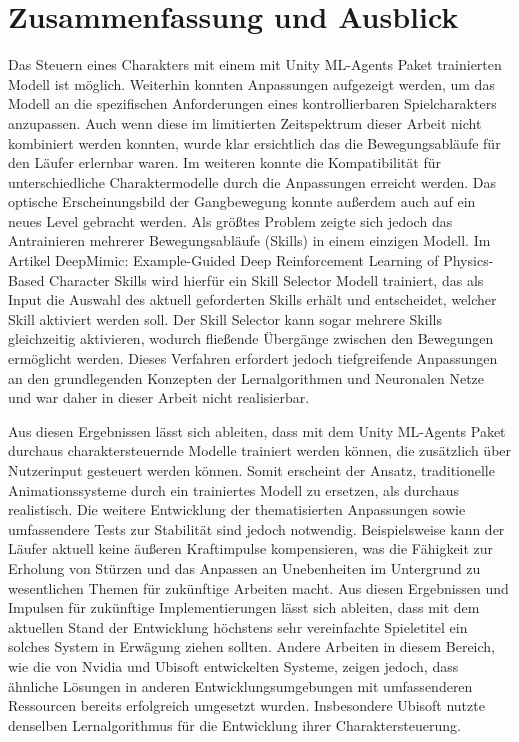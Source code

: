 {\chapter{Zusammenfassung und Ausblick}}
\label{sec:zusammenfassung_ausblick}
Das Steuern eines Charakters mit einem mit Unity ML-Agents Paket trainierten Modell ist möglich. Weiterhin konnten Anpassungen aufgezeigt werden, um das Modell an die spezifischen Anforderungen eines kontrollierbaren Spielcharakters anzupassen. Auch wenn diese im limitierten Zeitspektrum dieser Arbeit nicht kombiniert werden konnten, wurde klar ersichtlich das die Bewegungsabläufe für den Läufer erlernbar waren. Im weiteren konnte die Kompatibilität für unterschiedliche Charaktermodelle durch die Anpassungen erreicht werden. Das optische Erscheinungsbild der Gangbewegung konnte außerdem auch auf ein neues Level gebracht werden. Als größtes Problem zeigte sich jedoch das Antrainieren mehrerer Bewegungsabläufe (Skills) in einem einzigen Modell. Im Artikel \grqq{}DeepMimic: Example-Guided Deep Reinforcement Learning of Physics-Based Character Skills\grqq{} wird hierfür ein Skill Selector Modell trainiert, das als Input die Auswahl des aktuell geforderten Skills erhält und entscheidet, welcher Skill aktiviert werden soll. Der Skill Selector kann sogar mehrere Skills gleichzeitig aktivieren, wodurch fließende Übergänge zwischen den Bewegungen ermöglicht werden.\cite{peng2018deepmimic} Dieses Verfahren erfordert jedoch tiefgreifende Anpassungen an den grundlegenden Konzepten der Lernalgorithmen und Neuronalen Netze und war daher in dieser Arbeit nicht realisierbar.

Aus diesen Ergebnissen lässt sich ableiten, dass mit dem Unity ML-Agents Paket durchaus charaktersteuernde Modelle trainiert werden können, die zusätzlich über Nutzerinput gesteuert werden können. Somit erscheint der Ansatz, traditionelle Animationssysteme durch ein trainiertes Modell zu ersetzen, als durchaus realistisch. Die weitere Entwicklung der thematisierten Anpassungen sowie umfassendere Tests zur Stabilität sind jedoch notwendig. Beispielsweise kann der Läufer aktuell keine äußeren Kraftimpulse kompensieren, was die Fähigkeit zur Erholung von Stürzen und das Anpassen an Unebenheiten im Untergrund zu wesentlichen Themen für zukünftige Arbeiten macht. Aus diesen Ergebnissen und Impulsen für zukünftige Implementierungen lässt sich ableiten, dass mit dem aktuellen Stand der Entwicklung höchstens sehr vereinfachte Spieletitel ein solches System in Erwägung ziehen sollten. Andere Arbeiten in diesem Bereich, wie die von Nvidia und Ubisoft entwickelten Systeme, zeigen jedoch, dass ähnliche Lösungen in anderen Entwicklungsumgebungen mit umfassenderen Ressourcen bereits erfolgreich umgesetzt wurden.\cite{2022-TOG-ASE}\cite{10.1145/3355089.3356536} Insbesondere Ubisoft nutzte denselben Lernalgorithmus für die Entwicklung ihrer Charaktersteuerung.

